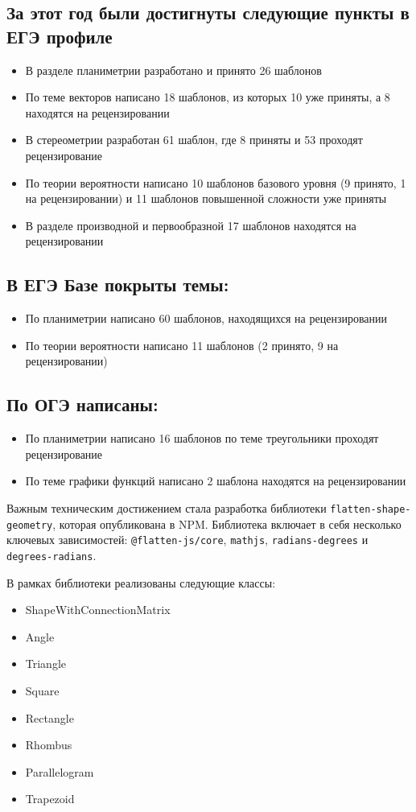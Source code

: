 \documentclass[a4paper, 12pt]{extarticle}
\begin{document}
\subsection*{За этот год были достигнуты следующие пункты в ЕГЭ профиле}%
\begin{itemize}
    \item В разделе планиметрии разработано и принято 26 шаблонов
    \item По теме векторов написано 18 шаблонов, из которых 10 уже приняты, а 8 находятся на рецензировании
    \item В стереометрии разработан 61 шаблон, где 8 приняты и 53 проходят рецензирование
    \item По теории вероятности написано 10 шаблонов базового уровня (9 принято, 1 на рецензировании) и 11 шаблонов повышенной сложности уже приняты
    \item В разделе производной и первообразной 17 шаблонов находятся на рецензировании
\end{itemize}

\subsection*{В ЕГЭ Базе покрыты темы:}
\begin{itemize}
	\item По планиметрии написано 60 шаблонов, находящихся на рецензировании
	\item По теории вероятности написано 11 шаблонов (2  принято, 9 на рецензировании)
\end{itemize}

\subsection*{По ОГЭ написаны:}
\begin{itemize}
	\item По планиметрии написано 16 шаблонов по теме треугольники проходят рецензирование
	\item По теме графики функций написано 2 шаблона находятся на рецензировании
\end{itemize}


Важным техническим достижением стала разработка библиотеки \texttt{flatten-shape-geometry}, которая опубликована в NPM. Библиотека включает в себя несколько ключевых зависимостей: \texttt{@flatten-js/core}, \texttt{mathjs}, \texttt{radians-degrees} и \texttt{degrees-radians}.

В рамках библиотеки реализованы следующие классы:
\begin{itemize}
    \item ShapeWithConnectionMatrix
    \item Angle
    \item Triangle
    \item Square
    \item Rectangle
    \item Rhombus
    \item Parallelogram
    \item Trapezoid
\end{itemize}
\end{document}
